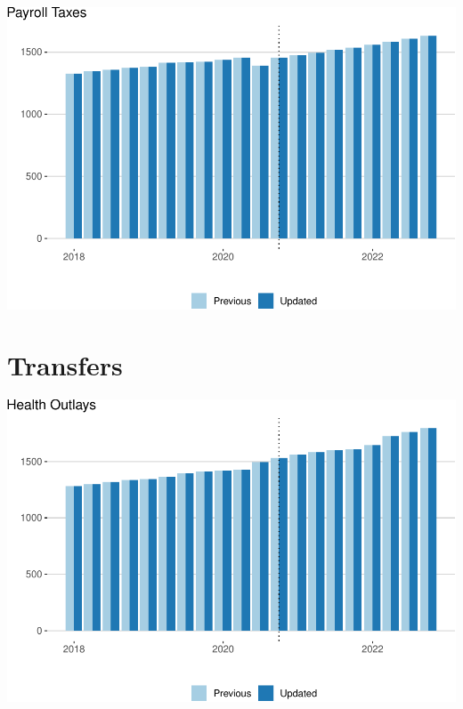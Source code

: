 \documentclass[
]{article}
\begin{document}
\begin{center}\includegraphics{update-changes-levels_files/figure-latex/payroll-taxes-1} \end{center}

\hypertarget{transfers}{%
\section{Transfers}\label{transfers}}

\begin{center}\includegraphics{update-changes-levels_files/figure-latex/health-outlays-1} \end{center}
\end{document}
